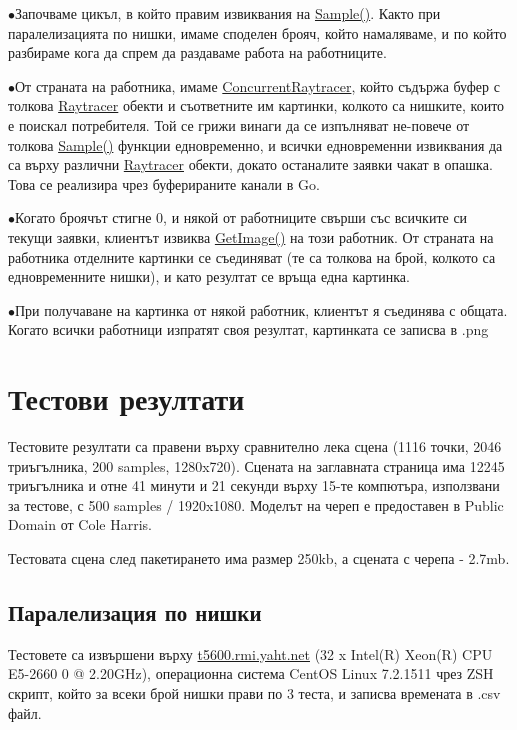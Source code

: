 \documentclass[12pt]{extarticle}
\newlength{\bulletwidth}\settowidth{\bulletwidth}{$\bullet$}
\newcommand{\mitem}{\vspace{5mm}\setlength{\leftskip}{\leftmargin}\hspace*{-\labelsep}\hspace*{-\bulletwidth}$\bullet$\hspace*{\labelsep}}
\newcommand{\mend}{\setlength{\leftskip}{0cm}\vspace{5mm}}
\begin{document}
	\mitem Започваме цикъл, в който правим извиквания на \href{https://godoc.org/github.com/DexterLB/traytor/rpc#RemoteRaytracer.Sample}{Sample()}.
	Както при паралелизацията по нишки, имаме споделен брояч, който
	намаляваме, и по който разбираме кога да спрем да раздаваме
	работа на работниците.
	
	\mitem От страната на работника, имаме \href{https://godoc.org/github.com/DexterLB/traytor/rpc#ConcurrentRaytracer}{ConcurrentRaytracer},
	който съдържа буфер с толкова \href{https://godoc.org/github.com/DexterLB/traytor/raytracer#Raytracer}{Raytracer} обекти и съответните
	им картинки, колкото са нишките, които е поискал потребителя. Той
	се грижи винаги да се изпълняват не-повече от толкова
	\href{https://godoc.org/github.com/DexterLB/traytor/raytracer#Raytracer.Sample}{Sample()}
	функции едновременно, и всички едновременни извиквания да са
	върху различни \href{https://godoc.org/github.com/DexterLB/traytor/raytracer#Raytracer}{Raytracer} обекти, докато останалите
	заявки чакат в опашка. Това се реализира
	чрез буферираните канали в Go.
	
	\mitem Когато броячът стигне 0, и някой от работниците свърши
	със всичките си текущи заявки, клиентът извиква
	\href{https://godoc.org/github.com/DexterLB/traytor/rpc#RemoteRaytracerCaller.GetImage}{GetImage()}
	на този работник. От страната на работника отделните картинки
	се съединяват (те са толкова на брой, колкото са едновременните
	нишки), и като резултат се връща една картинка.
	
	\mitem При получаване на картинка от някой работник, клиентът я
	съединява с общата. Когато всички работници изпратят своя
	резултат, картинката се записва в .png

	\mend

\section{Тестови резултати}
Тестовите резултати са правени върху сравнително лека сцена (1116
точки, 2046 триъгълника, 200 samples, 1280x720).
Сцената на заглавната страница има 12245
триъгълника и отне
41 минути и 21 секунди върху 15-те компютъра, използвани за тестове,
с 500 samples / 1920x1080.
Моделът на череп е предоставен в Public Domain от Cole Harris.

Тестовата сцена след пакетирането има размер 250kb, а сцената с
черепа - 2.7mb.

\subsection{Паралелизация по нишки}
Тестовете са извършени върху \url{t5600.rmi.yaht.net}
(32 x Intel(R) Xeon(R) CPU E5-2660 0 @ 2.20GHz),
операционна система CentOS Linux 7.2.1511 чрез ZSH скрипт,
който за всеки брой нишки прави по 3 теста, и записва времената
в .csv файл.
\end{document}
